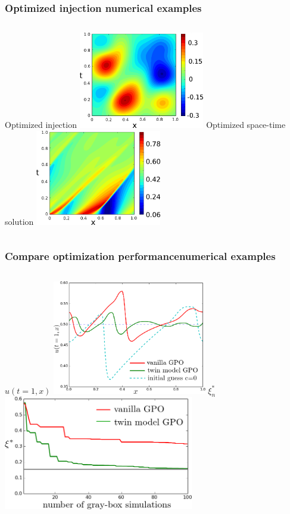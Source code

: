 \documentclass{beamer}
\begin{document}
\begin{frame}
    \frametitle{Optimized injection \hfill \scriptsize{numerical examples}}\small
    \begin{columns}
         \centering Optimized injection
        \includegraphics[width=5.5cm]{opt_source.png}
         \centering Optimized space-time solution
        \includegraphics[width=5.5cm]{LD_utx.png}
    \end{columns}
\end{frame}

\begin{frame}
    \frametitle{Compare optimization performance\hfill \scriptsize{numerical examples}}\small
    \begin{columns}
        \centering $u(t=1,x)$
        \includegraphics[width=6.cm,height=5cm]{finalutx.png}
         \centering $\xi^*_n$
        \includegraphics[width=6.cm,height=5cm]{opt_BL.png}
    \end{columns}
\end{frame}
\end{document}
